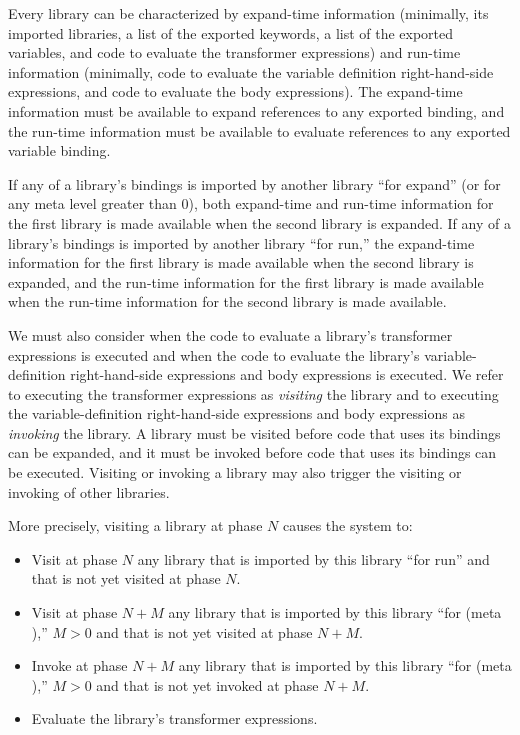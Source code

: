 Every library can be characterized by expand-time information (minimally,
its imported libraries, a list of the exported keywords, a list of the
exported variables, and code to evaluate the transformer expressions) and
run-time information (minimally, code to evaluate the variable definition
right-hand-side expressions, and code to evaluate the body expressions).
The expand-time information must be available to expand references to
any exported binding, and the run-time information must be available to
evaluate references to any exported variable binding.

If any of a library's bindings is imported by another library ``for
{\cf expand}'' (or for any meta level greater than 0), both expand-time and
run-time information for the first library is made available when the second
library is expanded.
If any of a library's bindings is imported by another library ``for
{\cf run},'' the expand-time information for the first library is made available when
the second library is expanded, and the run-time information for the first
library is made available when the run-time information for the second library
is made available.

We must also consider when the code to evaluate a library's transformer
expressions is executed and when the code to evaluate the library's
variable-definition right-hand-side expressions and body expressions is
executed.
We refer to executing the transformer expressions as \emph{visiting}
the library and to executing the variable-definition right-hand-side 
expressions and body expressions as \emph{invoking} the library.
A library must be visited before code that uses its bindings can be
expanded, and it must be invoked before code that uses its bindings can be
executed.
Visiting or invoking a library may also trigger the visiting or
invoking of other libraries.

More precisely, visiting a library at phase $N$ causes the system to:

\begin{itemize}
\item Visit at phase $N$ any library that is imported by this library
      ``for {\cf run}'' and that is not yet visited at phase $N$.
\item Visit at phase $N+M$ any library that is imported by this
      library ``for {\cf (meta )},'' $M>0$ and that is not yet
      visited at phase $N+M$.
\item Invoke at phase $N+M$ any library that is imported by this
      library ``for {\cf (meta )},'' $M>0$ and that is not yet
      invoked at phase $N+M$.
\item Evaluate the library's transformer expressions.
\end{itemize}

